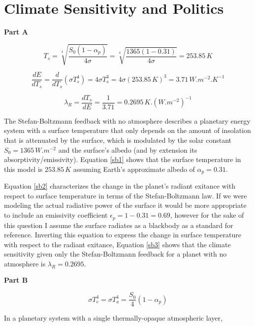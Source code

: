 \documentclass[12pt]{article}
\begin{document}
\section{Climate Sensitivity and Politics}

\noindent\textbf{Part A}

\begin{equation}\label{sb1}
    T_s = \sqrt[4]{\frac{S_0 (1-\alpha_p)}{4 \sigma}} = \sqrt[4]{\frac{1365 (1-0.31)}{4 \sigma}} = 253.85\,\si{K}
\end{equation}

\begin{equation}\label{sb2}
    \frac{d E}{d T_s} =  \frac{d}{dT_s}(\sigma T_s^4) = 4\sigma T_s^3 = 4 \sigma (253.85\,\si{K})^3 = 3.71\,\si{W.m^{-2}.K^{-1}}
\end{equation}

\begin{equation}\label{sb3}
    \lambda_R = \frac{d T_s}{d E} = \frac{1}{3.71} = 0.2695\,\si{K.(W.m^{-2})^{-1}}
\end{equation}

The Stefan-Boltzmann feedback with no atmosphere describes a planetary energy system with a surface temperature that only depends on the amount of insolation that is attenuated by the surface, which is modulated by the solar constant $S_0 = 1365\,\si{W.m^{-2}}$ and the surface's albedo (and by extension its absorptivity/emissivity). Equation \ref{sb1} shows that the surface temperature in this model is $253.85\,\si{K}$ assuming Earth's approximate albedo of $\alpha_p = 0.31$.

Equation \ref{sb2} characterizes the change in the planet's radiant exitance with respect to surface temperature in terms of the Stefan-Boltzmann law. If we were modeling the actual radiative power of the surface it would be more appropriate to include an emissivity coefficient $\epsilon_p = 1-0.31 = 0.69$, however for the sake of this question I assume the surface radiates as a blackbody as a standard for reference. Inverting this equation to express the change in surface temperature with respect to the radiant exitance, Equation \ref{sb3} shows that the climate sensitivity given only the Stefan-Boltzmann feedback for a planet with no atmosphere is $\lambda_R = 0.2695$.

\vspace{2em}\noindent\textbf{Part B}

\begin{equation}
    \sigma T_e^4 = \sigma T_a^4 = \frac{S_0}{4}(1-\alpha_p)
\end{equation}

In a planetary system with a single thermally-opaque atmospheric layer,

\begin{equation}
\end{equation}
\end{document}
